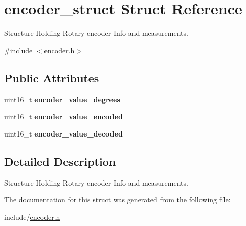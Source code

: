 \hypertarget{structencoder__struct}{\section{encoder\-\_\-struct Struct Reference}
\label{structencoder__struct}
}


Structure Holding Rotary encoder Info and measurements.  




{\ttfamily \#include $<$encoder.\-h$>$}

\subsection*{Public Attributes}
\begin{DoxyCompactItemize}
\item 
\hypertarget{structencoder__struct_a1a980b6a5b76189900e9a1b72f05e78b}{uint16\-\_\-t {\bfseries encoder\-\_\-value\-\_\-degrees}}\label{structencoder__struct_a1a980b6a5b76189900e9a1b72f05e78b}

\item 
\hypertarget{structencoder__struct_a4c0c3b5b018e90a90f6b753ffe990160}{uint16\-\_\-t {\bfseries encoder\-\_\-value\-\_\-encoded}}\label{structencoder__struct_a4c0c3b5b018e90a90f6b753ffe990160}

\item 
\hypertarget{structencoder__struct_a1c0fba4d751a8e95d9fccbc4be2b03d8}{uint16\-\_\-t {\bfseries encoder\-\_\-value\-\_\-decoded}}\label{structencoder__struct_a1c0fba4d751a8e95d9fccbc4be2b03d8}

\end{DoxyCompactItemize}


\subsection{Detailed Description}
Structure Holding Rotary encoder Info and measurements. 

The documentation for this struct was generated from the following file\-:\begin{DoxyCompactItemize}
\item 
include/\hyperlink{encoder_8h}{encoder.\-h}\end{DoxyCompactItemize}
